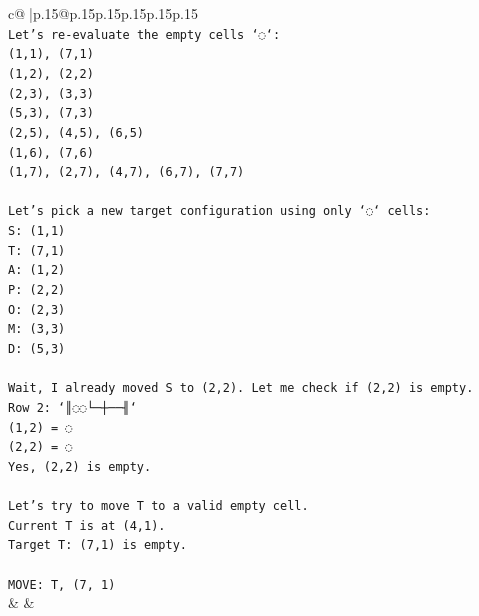 \documentclass{article}
\begin{document}
{\begin{supertabular}{c@{$\;$}|p{.15\linewidth}@{}p{.15\linewidth}p{.15\linewidth}p{.15\linewidth}p{.15\linewidth}p{.15\linewidth}}
{{{\\ 
\texttt{Let's re{-}evaluate the empty cells `◌`:} \\
\texttt{(1,1), (7,1)} \\
\texttt{(1,2), (2,2)} \\
\texttt{(2,3), (3,3)} \\
\texttt{(5,3), (7,3)} \\
\texttt{(2,5), (4,5), (6,5)} \\
\texttt{(1,6), (7,6)} \\
\texttt{(1,7), (2,7), (4,7), (6,7), (7,7)} \\
\\ 
\texttt{Let's pick a new target configuration using only `◌` cells:} \\
\texttt{S: (1,1)} \\
\texttt{T: (7,1)} \\
\texttt{A: (1,2)} \\
\texttt{P: (2,2)} \\
\texttt{O: (2,3)} \\
\texttt{M: (3,3)} \\
\texttt{D: (5,3)} \\
\\ 
\texttt{Wait, I already moved S to (2,2). Let me check if (2,2) is empty.} \\
\texttt{Row 2: `║◌◌└─┼──╢`} \\
\texttt{(1,2) = ◌} \\
\texttt{(2,2) = ◌} \\
\texttt{Yes, (2,2) is empty.} \\
\\ 
\texttt{Let's try to move T to a valid empty cell.} \\
\texttt{Current T is at (4,1).} \\
\texttt{Target T: (7,1) is empty.} \\
\\ 
\texttt{MOVE: T, (7, 1)} \\
            }
        }
    }
    & & \\ \\


\end{supertabular}}
\end{document}
